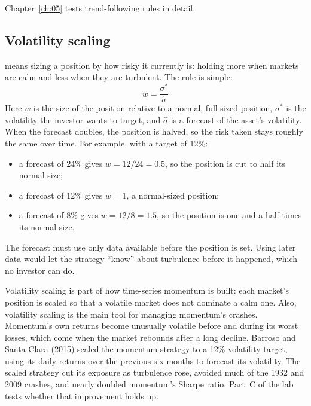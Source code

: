 Chapter~\ref{ch:05} tests trend-following rules in detail.


\subsection{Volatility scaling}

 means sizing a position by how risky it currently is: holding more when markets are calm and less when they are turbulent. The rule is simple:
\begin{equation}
  w = \frac{\sigma^*}{\hat\sigma}
  \label{eq:05-volscale}
\end{equation}
Here $w$ is the size of the position relative to a normal, full-sized position, $\sigma^*$ is the volatility the investor wants to target, and $\hat\sigma$ is a forecast of the asset's volatility. When the forecast doubles, the position is halved, so the risk taken stays roughly the same over time. For example, with a target of 12\%:

\begin{itemize}
  \item a forecast of 24\% gives $w = 12/24 = 0.5$, so the position is cut to half its normal size;
  \item a forecast of 12\% gives $w = 1$, a normal-sized position;
  \item a forecast of 8\% gives $w = 12/8 = 1.5$, so the position is one and a half times its normal size.
\end{itemize}

The forecast must use only data available before the position is set. Using later data would let the strategy ``know'' about turbulence before it happened, which no investor can do.

Volatility scaling is part of how time-series momentum is built: each market's position is scaled so that a volatile market does not dominate a calm one. 
Also, volatility scaling is the main tool for managing momentum's crashes. Momentum's own returns become unusually volatile before and during its worst losses, which come when the market rebounds after a long decline. Barroso and Santa-Clara (2015) scaled the momentum strategy to a 12\% volatility target, using its daily returns over the previous six months to forecast its volatility. The scaled strategy cut its exposure as turbulence rose, avoided much of the 1932 and 2009 crashes, and nearly doubled momentum's Sharpe ratio. Part~C of the lab tests whether that improvement holds up.


